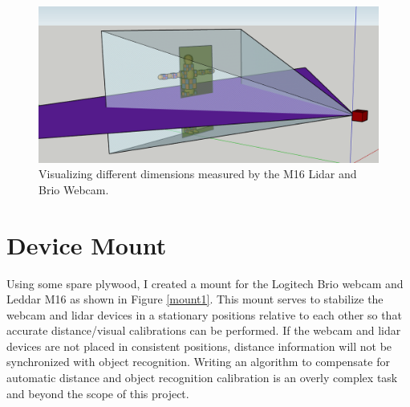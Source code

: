\documentclass[onecolumn, draftclsnofoot,10pt, compsoc]{IEEEtran}
\makeatletter
\newcommand\captionof[1]{\def\@captype{#1}\caption}
\makeatother
\begin{document}
\begin{singlespace}
		\begin{figure}[H]
			\includegraphics[scale=0.5]{different_dimensions.PNG}
			\captionof{figure}{Visualizing different dimensions measured by the M16 Lidar and Brio Webcam.}
			\label{dimensions}
		\end{figure}


	\section{Device Mount}
		Using some spare plywood, I created a mount for the Logitech Brio webcam and Leddar M16 as shown in Figure \ref{mount1}.
		This mount serves to stabilize the webcam and lidar devices in a stationary positions relative to each other so that accurate distance/visual calibrations can be performed.
		If the webcam and lidar devices are not placed in consistent positions, distance information will not be synchronized with object recognition.
		Writing an algorithm to compensate for automatic distance and object recognition calibration is an overly complex task and beyond the scope of this project.


\end{singlespace}
\end{document}
